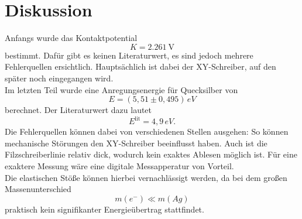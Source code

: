 \section{Diskussion}
\label{sec:Diskussion}
Anfangs wurde das Kontaktpotential
\[
	K = \SI{2.261}{\volt}
\]
bestimmt. Dafür gibt es keinen Literaturwert, es sind jedoch mehrere Fehlerquellen
ersichtlich. Hauptsächlich ist dabei der XY-Schreiber, auf den später noch eingegangen
wird.
\\
Im letzten Teil wurde eine Anregungsenergie für Quecksilber von 
\[
	E = (5,51 \pm 0,495) \, \si{eV}
\]
berechnet. Der Literaturwert dazu lautet \cite{leifi}
\[
	E^\text{lit} = 4,9 \, \si{eV}.
\]
Die Fehlerquellen können dabei von verschiedenen Stellen ausgehen: So können mechanische
Störungen den XY-Schreiber beeinflusst haben. Auch ist die Filzschreiberlinie relativ
dick, wodurch kein exaktes Ablesen möglich ist. Für eine exaktere Messung wäre eine digitale
Messapperatur von Vorteil.
\\
Die elastischen Stöße können hierbei vernachlässigt werden, da bei dem großen
Massenunterschied
\[
	m(e^-) \ll m(Ag)
\]
praktisch kein signifikanter Energieübertrag stattfindet.

